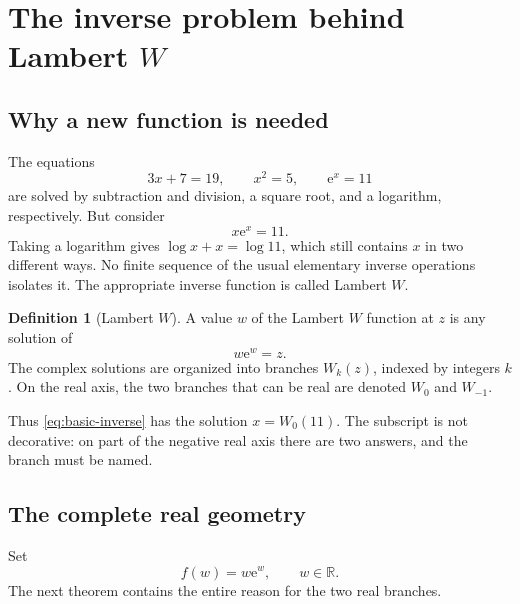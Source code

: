 \documentclass[11pt]{article}
\numberwithin{equation}{section}
\theoremstyle{definition}
\newtheorem{definition}[theorem]{Definition}
\theoremstyle{remark}
\newcommand{\e}{\mathrm e}
\begin{document}
\tableofcontents
\newpage

\section{The inverse problem behind Lambert \texorpdfstring{$W$}{W}}
\label{sec:real-branches}

\subsection{Why a new function is needed}

The equations
\[
  3x+7=19,\qquad x^2=5,\qquad \e^x=11
\]
are solved by subtraction and division, a square root, and a logarithm,
respectively.  But consider
\begin{equation}
  x\e^x=11.                                           \label{eq:basic-inverse}
\end{equation}
Taking a logarithm gives $\log x+x=\log 11$, which still contains $x$ in two
different ways.  No finite sequence of the usual elementary inverse operations
isolates it.  The appropriate inverse function is called Lambert $W$.

\begin{definition}[Lambert $W$]
A value $w$ of the Lambert $W$ function at $z$ is any solution of
\begin{equation}
  w\e^w=z.                                             \label{eq:defining}
\end{equation}
The complex solutions are organized into branches $W_k(z)$, indexed by
integers $k$.  On the real axis, the two branches that can be real are denoted
$W_0$ and $W_{-1}$.
\end{definition}

Thus \eqref{eq:basic-inverse} has the solution $x=W_0(11)$.  The subscript is
not decorative: on part of the negative real axis there are two answers, and
the branch must be named.

\subsection{The complete real geometry}

Set
\[
  f(w)=w\e^w,\qquad w\in\mathbb R.
\]
The next theorem contains the entire reason for the two real branches.
\end{document}
